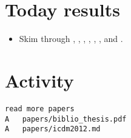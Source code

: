 \section*{Today results}
\begin{itemize}
	\item Skim through \cite{Hollenstein2010}, \cite{Cranshaw2012}, \cite{studentt12}, \cite{Outliers12}, \cite{subgroup12}, \cite{PDBSCANKisilevich2010}, \cite{Lee2014397} and \cite{TemporalClusters12}.
\end{itemize}
\section*{Activity}
\begin{verbatim}
read more papers
A	papers/biblio_thesis.pdf
A	papers/icdm2012.md
\end{verbatim}
